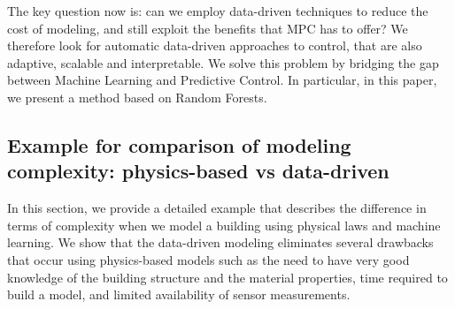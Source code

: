 \textcolor[rgb]{0,0,1}{The key question now is: can we employ data-driven techniques to reduce the cost of modeling, and still exploit the benefits that MPC has to offer?
We therefore look for automatic data-driven approaches to control, that are also adaptive, scalable and interpretable.
We solve this problem by bridging the gap between Machine Learning and Predictive Control. In particular, in this paper, we present a method based on Random Forests.}


\subsection{Example for comparison of modeling complexity: physics-based vs data-driven}
\textcolor[rgb]{0,0,1}{In this section, we provide a detailed example that describes the difference in terms of complexity when we model a building using physical laws and machine learning.
We show that the data-driven modeling eliminates several drawbacks that occur using physics-based models such as the need to have very good knowledge of the building structure and the material properties, time required to build a model, and limited availability of sensor measurements.}

